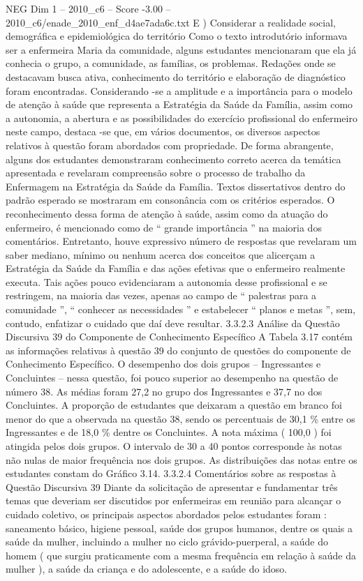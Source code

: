 \begin{textsample}{NEG Dim 1 – 2010\_c6 – Score -3.00 – 2010\_c6/enade\_2010\_enf\_d4ae7ada6c.txt}
E ) Considerar a realidade social, demográfica e epidemiológica do território Como o texto introdutório informava ser a enfermeira Maria da comunidade, alguns estudantes mencionaram que ela já conhecia o grupo, a comunidade, as famílias, os problemas.
Redações onde se destacavam busca ativa, conhecimento do território e elaboração de diagnóstico foram encontradas.
Considerando -se a amplitude e a importância para o modelo de atenção à saúde que representa a Estratégia da Saúde da Família, assim como a autonomia, a abertura e as possibilidades do exercício profissional do enfermeiro neste campo, destaca -se que, em vários documentos, os diversos aspectos relativos à questão foram abordados com propriedade.
De forma abrangente, alguns dos estudantes demonstraram conhecimento correto acerca da temática apresentada e revelaram compreensão sobre o processo de trabalho da Enfermagem na Estratégia da Saúde da Família.
Textos dissertativos dentro do padrão esperado se mostraram em consonância com os critérios esperados.
O reconhecimento dessa forma de atenção à saúde, assim como da atuação do enfermeiro, é mencionado como de “ grande importância ” na maioria dos comentários.
Entretanto, houve expressivo número de respostas que revelaram um saber mediano, mínimo ou nenhum acerca dos conceitos que alicerçam a Estratégia da Saúde da Família e das ações efetivas que o enfermeiro realmente executa.
Tais ações pouco evidenciaram a autonomia desse profissional e se restringem, na maioria das vezes, apenas ao campo de “ palestras para a comunidade ”, “ conhecer as necessidades ” e estabelecer “ planos e metas ”, sem, contudo, enfatizar o cuidado que daí deve resultar. 3.3.2.3 Análise da Questão Discursiva 39 do Componente de Conhecimento Específico A Tabela 3.17 contém as informações relativas à questão 39 do conjunto de questões do componente de Conhecimento Específico.
O desempenho dos dois grupos – Ingressantes e Concluintes – nessa questão, foi pouco superior ao desempenho na questão de número 38.
As médias foram 27,2 no grupo dos Ingressantes e 37,7 no dos Concluintes.
A proporção de estudantes que deixaram a questão em branco foi menor do que a observada na questão 38, sendo os percentuais de 30,1 \% entre os Ingressantes e de 18,0 \% dentre os Concluintes.
A nota máxima ( 100,0 ) foi atingida pelos dois grupos.
O intervalo de 30 a 40 pontos corresponde às notas não nulas de maior frequência nos dois grupos.
As distribuições das notas entre os estudantes constam do Gráfico 3.14. 3.3.2.4 Comentários sobre as respostas à Questão Discursiva 39 Diante da solicitação de apresentar e fundamentar três temas que deveriam ser discutidos por enfermeiras em reunião para alcançar o cuidado coletivo, os principais aspectos abordados pelos estudantes foram : saneamento básico, higiene pessoal, saúde dos grupos humanos, dentre os quais a saúde da mulher, incluindo a mulher no ciclo grávido-puerperal, a saúde do homem ( que surgiu praticamente com a mesma frequência em relação à saúde da mulher ), a saúde da criança e do adolescente, e a saúde do idoso.

\end{textsample}

